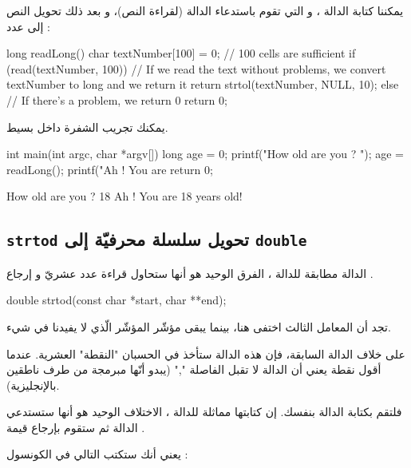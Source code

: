 يمكننا كتابة الدالة
،
و التي تقوم باستدعاء الدالة
(لقراءة النص)، و بعد ذلك تحويل النص إلى عدد :

\begin{Csource}
long readLong()
{
 	char textNumber[100] = {0}; // 100 cells are sufficient
 	if (read(textNumber, 100))
 	{
     		// If we read the text without problems, we convert textNumber to long and we return it
    		 return strtol(textNumber, NULL, 10);
 	}
 	else
 	{
    		 // If there's a problem, we return 0
     		return 0;
	 }
}
\end{Csource}

يمكنك تجريب الشفرة داخل
بسيط.

\begin{Csource}
int main(int argc, char *argv[])
{
 	long age = 0;
 	printf("How old are you ? ");
 	age = readLong();
 	printf("Ah ! You are %
 	return 0;
}
\end{Csource}

\begin{Console}
How old are you ? 18
Ah ! You are 18 years old!
\end{Console}

\subsection{\texttt{strtod} تحويل سلسلة محرفيّة إلى \texttt{double}}

الدالة
مطابقة للدالة
،
الفرق الوحيد هو أنها ستحاول قراءة عدد عشريّ و إرجاع
.

\begin{Csource}
double strtod(const char *start, char **end);
\end{Csource}

تجد أن المعامل الثالث
اختفى هنا، بينما يبقى مؤشّر المؤشّر
الّذي لا يفيدنا في شيء.

على خلاف الدالة السابقة، فإن هذه الدالة ستأخذ في الحسبان "النقطة" العشرية. عندما أقول نقطة يعني أن الدالة لا تقبل الفاصلة
"\textenglish{,}"
(يبدو أنّها مبرمجة من طرف ناطقين بالإنجليزية).

فلتقم بكتابة الدالة
بنفسك. إن كتابتها مماثلة للدالة
،
الاختلاف الوحيد هو أنها ستستدعي الدالة
ثم ستقوم بإرجاع قيمة
.

يعني أنك ستكتب التالي في الكونسول :

